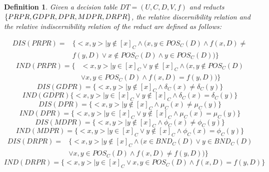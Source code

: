\documentclass[review]{elsarticle}
\newtheorem{myDef}{Definition}
\begin{document}
		\begin{myDef}
			Given a decision table $DT=(U,C,D,V,f)$ and reducts $\{PRPR,\\ GDPR, DPR, MDPR, DRPR\}$, the relative discernibility relation and the relative indiscernibility relation of the reduct are defined as follows:
			\begin{spacing}{0.6}
				\begin{equation}\begin{split}
					DIS(PRPR)=&\{<x,y>| y \not \in [x]_C \wedge (x,y \in POS_C(D) \wedge f(x,D) \neq \\&f(y,D) \vee  x \not \in POS_C(D) \wedge y \in POS_C(D))\}
				\end{split}\end{equation}
				\begin{equation}\begin{split}
					IND(PRPR)=\{&<x,y>|y \in [x]_C \vee y \not \in [x]_C \wedge (x,y \not \in POS_C(D)  \\
					& \vee x,y \in POS_C(D) \wedge f(x,D)=f(y,D) )  \}
				\end{split}\end{equation}
				\begin{equation}DIS(GDPR)=\{ <x,y>|y \not \in [x]_C \wedge \delta_C(x) \neq \delta_C(y) \} \end{equation}
				\begin{equation}IND(GDPR)\{<x,y>|y \in [x]_C \vee y \not \in [x]_C \wedge \delta_C(x) = \delta_C(y)\}\end{equation}
				\begin{equation}DIS(DPR)=\{<x,y>|y \not \in [x]_C \wedge \mu_C(x) \neq \mu_C(y)\}\end{equation}
				\begin{equation}IND(DPR)=\{<x,y>|y \in [x]_C \vee y \not \in [x]_C \wedge \mu_C(x) = \mu_C(y)\}\end{equation}
				\begin{equation}DIS(MDPR)=\{<x,y>|y \not \in [x]_C \wedge \phi_C(x) \neq \phi_C(y)\}\end{equation}
				\begin{equation}IND(MDPR)=\{<x,y>|y \in [x]_C \vee y \not \in [x]_C \wedge \phi_C(x) = \phi_C(y)\}\end{equation}
				\begin{equation}\begin{split}
					DIS(DRPR)=&\{<x,y>|y \not \in [x]_C \wedge(x \in BND_C(D) \vee y \in BND_C(D) \\
					&\vee x,y \in POS_C(D) \wedge f(x,D) \neq f(y,D)) \}
				\end{split}\end{equation}
				\begin{equation}
				IND(DRPR)=\{<x,y>|y \in [x]_C \vee x,y \in POS_C(D) \wedge f(x,D)=f(y,D)\}
				\end{equation}
			\end{spacing}
		\end{myDef}
\end{document}
